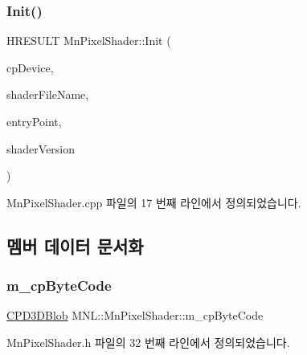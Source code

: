 \subsubsection{\texorpdfstring{Init()}{Init()}}
{\footnotesize\ttfamily H\+R\+E\+S\+U\+LT Mn\+Pixel\+Shader\+::\+Init (\begin{DoxyParamCaption}\item[{\hyperlink{namespace_m_n_l_a1eec210db8f309a4a9ac0d9658784c31}{C\+P\+D3\+D\+Device}}]{cp\+Device,  }\item[{std\+::wstring}]{shader\+File\+Name,  }\item[{std\+::string}]{entry\+Point,  }\item[{std\+::string}]{shader\+Version }\end{DoxyParamCaption})}



Mn\+Pixel\+Shader.\+cpp 파일의 17 번째 라인에서 정의되었습니다.



\subsection{멤버 데이터 문서화}
\mbox{\label{class_m_n_l_1_1_mn_pixel_shader_a427dfc261b2d4ae857025c00063d1e97}} 
\subsubsection{\texorpdfstring{m\+\_\+cp\+Byte\+Code}{m\_cpByteCode}}
{\footnotesize\ttfamily \hyperlink{namespace_m_n_l_a3716e3bee60c31fe1b7b5dd5a82db59a}{C\+P\+D3\+D\+Blob} M\+N\+L\+::\+Mn\+Pixel\+Shader\+::m\+\_\+cp\+Byte\+Code\hspace{0.3cm}{\ttfamily [private]}}



Mn\+Pixel\+Shader.\+h 파일의 32 번째 라인에서 정의되었습니다.

\mbox{\label{class_m_n_l_1_1_mn_pixel_shader_a93c58b6b8428e3187e9ef53f1c7f3578}} 

